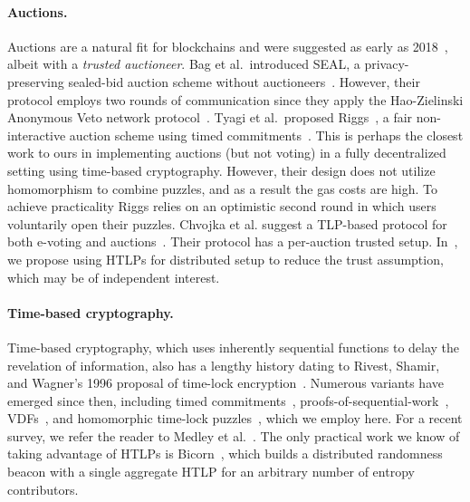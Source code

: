 \paragraph{Auctions.} 
Auctions are a natural fit for blockchains and were suggested as early as 2018~\cite{cryptoeprint:2018/704}, albeit with a \emph{trusted auctioneer}. Bag et al.\ introduced SEAL, a privacy-preserving sealed-bid auction scheme without auctioneers~\cite{bag2019seal}. However, their protocol employs two rounds of communication since they apply the Hao-Zielinski Anonymous Veto network protocol~\cite{hao20062}. Tyagi et al.\ proposed Riggs~\cite{tyagi2023riggs}, a fair non-interactive auction scheme using timed commitments~\cite[\S6]{freitag2021nonmalleable}. This is perhaps the closest work to ours in implementing auctions (but not voting) in a fully decentralized setting using time-based cryptography. However, their design does not utilize homomorphism to combine puzzles, and as a result the gas costs are high. To achieve practicality Riggs relies on an optimistic second round in which users voluntarily open their puzzles. %
Chvojka et al. suggest a TLP-based protocol for both e-voting and auctions~\cite{chvojka2021versatile}. Their protocol has a per-auction trusted setup. In~, we propose using HTLPs for distributed setup to reduce the trust assumption, which may be of independent interest.

\paragraph{Time-based cryptography.} 
Time-based cryptography, which uses inherently sequential functions to delay the revelation of information, also has a lengthy history dating to Rivest, Shamir, and Wagner's 1996 proposal of time-lock encryption~\cite{rivest1996time}.
Numerous variants have emerged since then, including timed commitments~\cite{boneh2000timed}, proofs-of-sequential-work~\cite{mahmoody2013publicly}, VDFs~\cite{boneh2018verifiable}, and homomorphic time-lock puzzles~\cite{malavolta2019homomorphic}, which we employ here.
For a recent survey, we refer the reader to Medley et al.~\cite{medley2023sok}. The only practical work we know of taking advantage of HTLPs is Bicorn~\cite{choi2023bicorn}, which builds a distributed randomness beacon with a single aggregate HTLP for an arbitrary number of entropy contributors.

